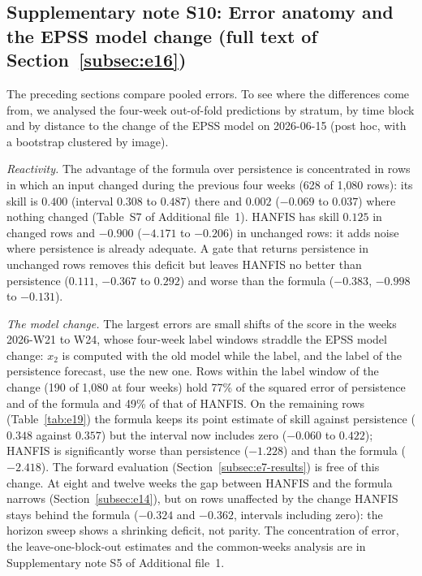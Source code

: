 \documentclass[pdflatex,sn-basic]{sn-jnl}
\theoremstyle{thmstyleone}%
\theoremstyle{thmstyletwo}%
\theoremstyle{thmstylethree}%
\begin{document}
\subsection*{Supplementary note S10: Error anatomy and the EPSS model change (full text of Section~\ref{subsec:e16})}
The preceding sections compare pooled errors. To see where the differences come from, we analysed the four-week out-of-fold predictions by stratum, by time block and by distance to the change of the EPSS model on 2026-06-15 (post hoc, with a bootstrap clustered by image).

\emph{Reactivity.} The advantage of the formula over persistence is concentrated in rows in which an input changed during the previous four weeks (628 of 1{,}080 rows): its skill is $0.400$ (interval $0.308$ to $0.487$) there and $0.002$ ($-0.069$ to $0.037$) where nothing changed (Table~S7 of Additional file~1). HANFIS has skill $0.125$ in changed rows and $-0.900$ ($-4.171$ to $-0.206$) in unchanged rows: it adds noise where persistence is already adequate. A gate that returns persistence in unchanged rows removes this deficit but leaves HANFIS no better than persistence ($0.111$, $-0.367$ to $0.292$) and worse than the formula ($-0.383$, $-0.998$ to $-0.131$).

\emph{The model change.} The largest errors are small shifts of the score in the weeks 2026-W21 to W24, whose four-week label windows straddle the EPSS model change: $x_2$ is computed with the old model while the label, and the label of the persistence forecast, use the new one. Rows within the label window of the change (190 of 1{,}080 at four weeks) hold 77\% of the squared error of persistence and of the formula and 49\% of that of HANFIS. On the remaining rows (Table~\ref{tab:e19}) the formula keeps its point estimate of skill against persistence ($0.348$ against $0.357$) but the interval now includes zero ($-0.060$ to $0.422$); HANFIS is significantly worse than persistence ($-1.228$) and than the formula ($-2.418$). The forward evaluation (Section~\ref{subsec:e7-results}) is free of this change. At eight and twelve weeks the gap between HANFIS and the formula narrows (Section~\ref{subsec:e14}), but on rows unaffected by the change HANFIS stays behind the formula ($-0.324$ and $-0.362$, intervals including zero): the horizon sweep shows a shrinking deficit, not parity. The concentration of error, the leave-one-block-out estimates and the common-weeks analysis are in Supplementary note S5 of Additional file~1.
\end{document}
